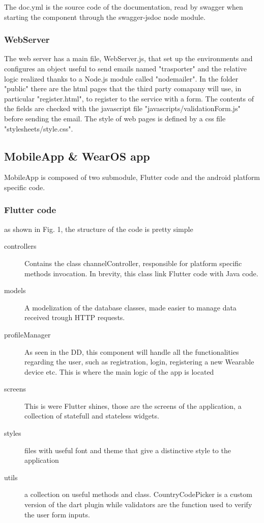 \documentclass[../main.tex]{subfiles}
\begin{document}
The doc.yml is the source code of the documentation, read by swagger when starting the component through the swagger-jsdoc node module.

\subsubsection{WebServer}

The web server has a main file, WebServer.js, that set up the environments and configures an object useful to send emails named "trasporter" and the relative logic realized thanks to a Node.js module called "nodemailer".
In the folder "public" there are the html pages that the third party comapany will use, in particular "register.html", to register to the service with a form. The contents of the fields are checked with the javascript file "javascripts/validationForm.js" before sending the email.
The style of web pages is defined by a css file "stylesheets/style.css".

\subsection{MobileApp & WearOS app}
MobileApp is composed of two submodule, Flutter code and the android platform specific code.

\subsubsection{Flutter code}
as shown in Fig. 1, the structure of the code is pretty simple
\begin{description}
	\item[controllers] Contains the class channelController, responsible for platform specific methods invocation. In brevity, this class link Flutter code with Java code.
	\item[models] A modelization of the database classes, made easier to manage data received trough HTTP requests.
	\item[profileManager] As seen in the DD, this component will handle all the functionalities regarding the user, such as registration, login, registering a new Wearable device etc. This is where the main logic of the app is located
	\item[screens] This is were Flutter shines, those are the screens of the application, a collection of statefull and stateless widgets.
	\item[styles] files with useful font and theme that give a distinctive style to the application
	\item[utils] a collection on useful methods and class. CountryCodePicker is a custom version of the dart plugin while validators are the function used to verify the user form inputs.
\end{description}
\end{document}
